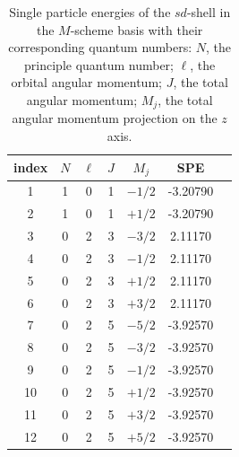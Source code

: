 \documentclass[aps,prl,reprint,groupedaddress]{revtex4-1}  %
\begin{document}
\begin{table}[H]
\caption{Single particle energies of the $sd$-shell in the $M$-scheme basis with their corresponding quantum numbers: $N$, the principle quantum number; $\ell$, the orbital angular momentum; $J$, the total angular momentum; $M_j$, the total angular momentum projection on the $z$ axis. \label{tab:SPE}}
\begin{ruledtabular}
\begin{tabular}{c|cccccc}
index	&	$N$	&	$\ell$	&	$J$	&	$M_j$	&	SPE			\\
\hline 
1		&	1	&	0		&	1	&	$-1/2$	&	-3.20790	\\
2		&	1	&	0		&	1	&	$+1/2$	&	-3.20790	\\
3		& 	0	&	2		&	3	&	$-3/2$	&	 2.11170	\\
4		&	0	&	2		&	3	&	$-1/2$	&	 2.11170	\\
5		&	0	&	2		&	3	&	$+1/2$	&	 2.11170	\\
6		&	0	&	2		&	3	&	$+3/2$	&	 2.11170	\\
7		&	0	&	2		&	5	&	$-5/2$	&	-3.92570	\\
8		&	0	&	2		&	5	&	$-3/2$	&	-3.92570	\\
9		&	0	&	2		&	5	&	$-1/2$	&	-3.92570	\\
10		&	0	&	2		&	5	&	$+1/2$	&	-3.92570	\\
11		&	0	&	2		&	5	&	$+3/2$	&	-3.92570	\\
12		&	0	&	2		&	5	&	$+5/2$	&	-3.92570	
\end{tabular}
\end{ruledtabular}
\end{table}
\end{document}
